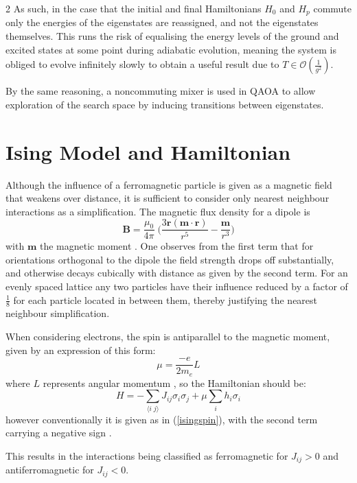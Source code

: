 \documentclass [10pt]{article}
\newcommand {\qeval}[1] {\langle #1 \rangle}
\begin{document}
\begin {multicols}{2}
As such, in the case that the initial and final Hamiltonians $H_0$ and $H_p$
commute only the energies of the eigenstates are reassigned, and not the
eigenstates themselves. This runs the risk of equalising the energy levels of
the ground and excited states at some point during adiabatic evolution,
meaning the system is obliged to evolve infinitely slowly to obtain a
useful result due to $T \in \mathcal{O}(\frac{1}{g^2})$.

By the same reasoning, a noncommuting mixer is used in QAOA to allow
exploration of the search space by inducing transitions between eigenstates.

\section {Ising Model and Hamiltonian}
\label {ising}
Although the influence of a ferromagnetic particle is given as a magnetic
field that weakens over distance, it is sufficient to consider only nearest
neighbour interactions as a simplification.
The magnetic flux density for a dipole is
\begin {equation*}
\mathbf{B} = \frac{\mu_0}{4\pi} \; \big(\frac{3\mathbf{r(m \cdot r)}}{r^5}
- \frac{\mathbf{m}}{r^3}\big)
\end {equation*}
with $\mathbf{m}$ the magnetic moment \cite{dipoleflux}.
One observes from the first term that
for orientations orthogonal to the dipole the field strength drops off
substantially, and otherwise decays cubically with distance as given by the
second term. For an evenly spaced lattice any two particles have their influence
reduced by a factor of $\frac{1}{8}$ for each particle located in between them,
thereby justifying the nearest neighbour simplification.

When considering electrons, the spin is antiparallel to the magnetic moment,
given by an expression of this form:
\begin {equation*}
\mu = \frac{-e}{2m_e} L
\end {equation*}
where $L$ represents angular momentum \cite{mu_e}, so the Hamiltonian should be:
\begin {equation*}
H = - \sum_{\qeval{i\;j}} J_{ij} \sigma_i \sigma_j + \mu \sum_{i} h_i \sigma_i
\end {equation*}
however conventionally it is given as in (\ref{isingspin}), with the second term
carrying a negative sign \cite{isingconv}.

This results in the interactions being classified as ferromagnetic for
$J_{ij} > 0$ and antiferromagnetic for $J_{ij} < 0$.

\end {multicols}
\end{document}

